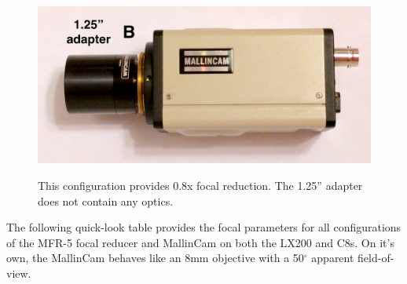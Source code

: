 \documentclass[12pt,titlepage]{article}
\renewcommand\deg{\mbox{$^\circ$}}
\begin{document}
\begin{appendix}
\begin{figure}[H]
\begin{center}
		\includegraphics[width=.6\textwidth]{./images/mallincam/focal_reduction/B_adapter.jpg} 
		\label{mfr5_B}
		\caption{This configuration provides 0.8x focal reduction.
				The 1.25'' adapter does not contain any optics.}
	\end{center}
\end{figure}
The following quick-look table provides the focal parameters for all configurations
of the MFR-5 focal reducer and MallinCam on both the LX200 and C8s.
On it's own, the MallinCam behaves like an 8mm objective with a 50$\deg$ apparent field-of-view.


\end{appendix}
\end{document}
